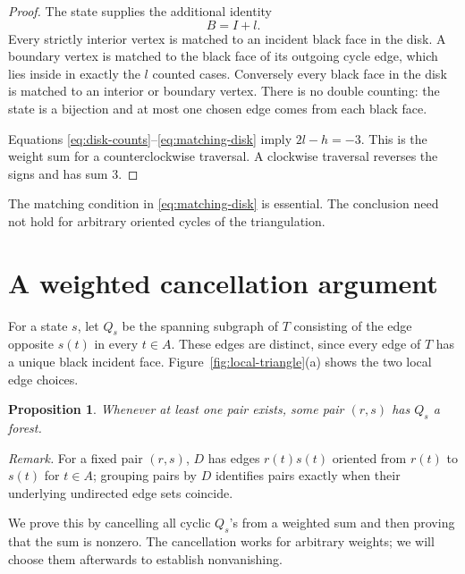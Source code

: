 \documentclass[11pt]{article}
\newtheorem{proposition}[theorem]{Proposition}
\theoremstyle{remark}
\numberwithin{equation}{section}
\begin{document}
\begin{proof}
The state supplies the additional identity
\begin{equation}\label{eq:matching-disk}
 B=I+l.
\end{equation}
Every strictly interior vertex is matched to an incident
black face in the disk. A boundary vertex is matched to the
black face of its outgoing cycle edge, which lies inside in
exactly the \(l\) counted cases. Conversely every black face
in the disk is matched to an interior or boundary vertex.
There is no double counting: the state is a bijection and
at most one chosen edge comes from each black face.

Equations \eqref{eq:disk-counts}--\eqref{eq:matching-disk}
imply \(2l-h=-3\). This is the weight sum for a
counterclockwise traversal. A clockwise traversal reverses
the signs and has sum \(3\).
\end{proof}

The matching condition in \eqref{eq:matching-disk} is essential.
The conclusion need not hold for arbitrary oriented cycles
of the triangulation.

\section{A weighted cancellation argument}\label{sec:cancellation}

For a state \(s\), let \(Q_s\) be the spanning subgraph of
\(T\) consisting of the edge opposite \(s(t)\) in every
\(t\in A\). These edges are distinct, since every edge of
\(T\) has a unique black incident face.
Figure~\ref{fig:local-triangle}(a) shows the two local edge choices.

\begin{proposition}\label{prop:forest-state}
Whenever at least one pair exists, some pair \((r,s)\) has
\(Q_s\) a forest.
\end{proposition}

\noindent\textit{Remark.} For a fixed pair $(r,s)$, $D$ has edges $r(t)s(t)$ oriented from $r(t)$ to $s(t)$ for $t\in A$; grouping pairs by $D$ identifies pairs exactly when their underlying undirected edge sets coincide.


We prove this by cancelling all cyclic \(Q_s\)'s from a
weighted sum and then proving that the sum is nonzero.
The cancellation works for arbitrary weights; we will choose them
afterwards to establish nonvanishing.
\end{document}
